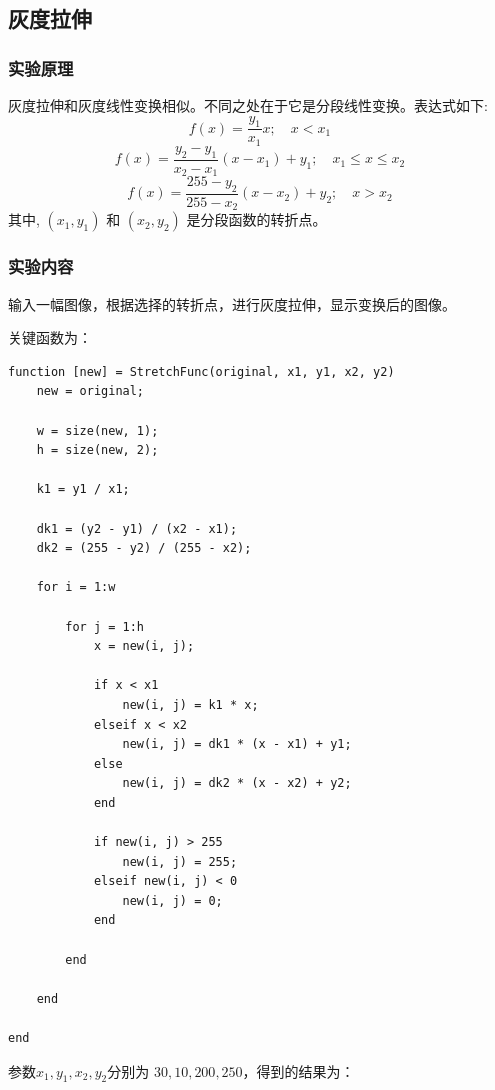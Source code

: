 \documentclass{ctexart}
\begin{document}
\subsection{\hei 灰度拉伸}
\subsubsection{\hei 实验原理}
灰度拉伸和灰度线性变换相似。不同之处在于它是分段线性变换。表达式如下:
$$f(x)=\frac{y_{1}}{x_{1}} x ; \quad x<x_{1}$$
$$f(x)=\frac{y_{2}-y_{1}}{x_{2}-x_{1}}\left(x-x_{1}\right)+y_{1} ; \quad x_{1} \leq x \leq x_{2}$$
$$f(x)=\frac{255-y_{2}}{255-x_{2}}\left(x-x_{2}\right)+y_{2} ; \quad x>x_{2}$$
其中, $\left(x_{1}, y_{1}\right)$ 和 $\left(x_{2}, y_{2}\right)$ 是分段函数的转折点。
\subsubsection{\hei 实验内容}
输入一幅图像，根据选择的转折点，进行灰度拉伸，显示变换后的图像。
\par 关键函数为：
\begin{lstlisting}[frame=single]
function [new] = StretchFunc(original, x1, y1, x2, y2)
    new = original;

    w = size(new, 1);
    h = size(new, 2);

    k1 = y1 / x1;

    dk1 = (y2 - y1) / (x2 - x1);
    dk2 = (255 - y2) / (255 - x2);

    for i = 1:w

        for j = 1:h
            x = new(i, j);

            if x < x1
                new(i, j) = k1 * x;
            elseif x < x2
                new(i, j) = dk1 * (x - x1) + y1;
            else
                new(i, j) = dk2 * (x - x2) + y2;
            end

            if new(i, j) > 255
                new(i, j) = 255;
            elseif new(i, j) < 0
                new(i, j) = 0;
            end

        end

    end

end
\end{lstlisting}
\par 参数$x_{1}, y_{1}, x_{2}, y_{2}$分别为
$30, 10, 200, 250$，得到的结果为：
\end{document}
